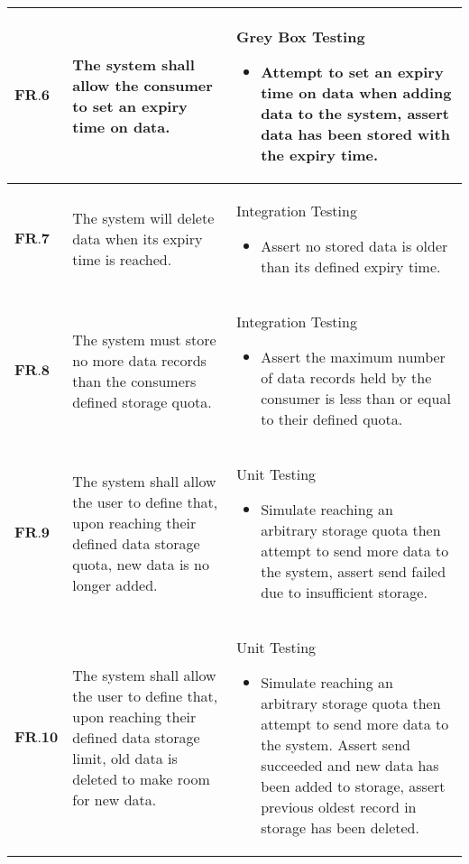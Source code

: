 \begin{longtable}[H]{| p{1.5cm} | p{4.5cm} | p{10.5cm}| }
        $\textbf{FR.6} $ & The system shall allow the consumer to set an expiry time on data.                                                                             & Grey Box Testing\begin{itemize} \item Attempt to set an expiry time on data when adding data to the system, assert data has been stored with the expiry time.\end{itemize}                                                                                                         \\ \hline
       $ \textbf{FR.7} $ & The system will delete data when its expiry time is reached.                                                                                   & Integration Testing\begin{itemize} \item Assert no stored data is older than its defined expiry time.\end{itemize}                                                                                                                                                                  \\ \hline
        $\textbf{FR.8}$  & The system must store no more data records than the consumers defined storage quota.                                                           & Integration Testing\begin{itemize} \item Assert the maximum number of data records held by the consumer is less than or equal to their defined quota.\end{itemize}                                                                                                                  \\ \hline
        $\textbf{FR.9} $ & The system shall allow the user to define that, upon reaching their defined data storage quota, new data is no longer added.                   & Unit Testing\begin{itemize} \item Simulate reaching an arbitrary storage quota then attempt to send more data to the system, assert send failed due to insufficient storage.\end{itemize}                                                                                       \\ \hline
    	$\textbf{FR.10}$ & The system shall allow the user to define that, upon reaching their defined data storage limit, old data is deleted to make room for new data. & Unit Testing\begin{itemize} \item Simulate reaching an arbitrary storage quota then attempt to send more data to the system. Assert send succeeded and new data has been added to storage, assert previous oldest record in storage has been deleted.\end{itemize} \\ \hline
\end{longtable}

